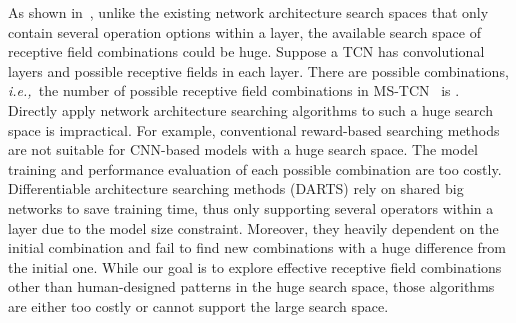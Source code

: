 \documentclass[final]{cvpr}
\def\ie{\emph{i.e.,~}}
\begin{document}
As shown in~,
unlike the existing network architecture search spaces
\cite{liu2019darts,cai2018proxylessnas,howard2019searching} 
that only contain several operation options within a layer,
the available search space of receptive field combinations could be huge. 
Suppose a TCN has  convolutional layers and  possible receptive fields 
in each layer.
There are  possible combinations,
\ie the number of possible receptive field combinations 
in MS-TCN~\cite{farha2019ms} is .
Directly apply network architecture searching algorithms
\cite{howard2019searching,liu2019auto,liu2019darts,xie2017genetic} 
to such a huge search space is impractical.
For example, conventional reward-based searching methods
\cite{real2019regularized,liu2017hierarchical,xie2017genetic} 
are not suitable for CNN-based models with a huge search space.
The model training and performance evaluation of each possible combination are too costly.
Differentiable architecture searching methods (DARTS)
\cite{liu2019darts,cai2018proxylessnas,liu2019auto} 
rely on shared big networks to save training time,
thus only supporting several operators within a layer due to 
the model size constraint.  
Moreover, they heavily dependent on the initial combination and fail to 
find new combinations with a huge difference from the initial one.
While our goal is to explore effective receptive field combinations other than
human-designed patterns in the huge search space, 
those algorithms are either too costly or cannot support the large search space.
\end{document}
